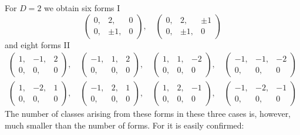 For \(D=2\) we obtain six forms I
\[
\left(\begin{smallmatrix}0,&2,&0\\0,&\pm1,&0\end{smallmatrix}\right),\quad
\left(\begin{smallmatrix}0,&2,&\pm1\\0,&\pm1,&0\end{smallmatrix}\right)
\]
and eight forms II
\[
\begin{gathered}
\left(\begin{smallmatrix}1,&-1,&2\\0,&0,&0\end{smallmatrix}\right),\quad
\left(\begin{smallmatrix}-1,&1,&2\\0,&0,&0\end{smallmatrix}\right),\quad
\left(\begin{smallmatrix}1,&1,&-2\\0,&0,&0\end{smallmatrix}\right),\quad
\left(\begin{smallmatrix}-1,&-1,&-2\\0,&0,&0\end{smallmatrix}\right)\\
\left(\begin{smallmatrix}1,&-2,&1\\0,&0,&0\end{smallmatrix}\right),\quad
\left(\begin{smallmatrix}-1,&2,&1\\0,&0,&0\end{smallmatrix}\right),\quad
\left(\begin{smallmatrix}1,&2,&-1\\0,&0,&0\end{smallmatrix}\right),\quad
\left(\begin{smallmatrix}-1,&-2,&-1\\0,&0,&0\end{smallmatrix}\right)
\end{gathered}
\]
The number of classes arising from these forms in these three cases is, however, much smaller than the number of forms. For it is easily confirmed:

